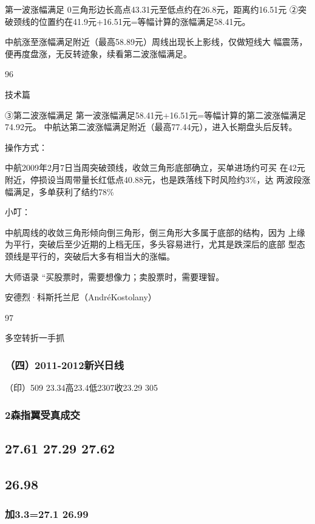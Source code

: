 \documentclass{article}
\begin{document}
第一波涨幅满足 0三角形边长高点43.31元至低点约在26.8元，距离约16.51元 ②突破颈线的位置约在41.9元+16.51元=等幅计算的涨幅满足58.41元。

中航涨至涨幅满足附近（最高58.89元）周线出现长上影线，仅做短线大 幅震荡，便再度盘涨，无反转迹象，续看第二波涨幅满足。

96

\clearpage

技术篇

③第二波涨幅满足 第一波涨幅满足58.41元+16.51元=等幅计算的第二波涨幅满足74.92元。 中航达第二波涨幅满足附近（最高77.44元），进入长期盘头后反转。

操作方式：

中航2009年2月7日当周突破颈线，收敛三角形底部确立，买单进场约可买 在42元附近，停损设当周带量长红低点40.88元，也是跌落线下时风险约3\%，达 两波段涨幅满足，多单获利了结约78\%

小叮：

中航周线的收敛三角形倾向倒三角形，倒三角形大多属于底部的结构，因为 上缘为平行，突破后至少近期的上档无压，多头容易进行，尤其是跌深后的底部 型态颈线是平行的，突破后大多有相当大的涨幅。

大师语录 “买股票时，需要想像力；卖股票时，需要理智。

安德烈·科斯托兰尼（AndréKostolany）

97

\clearpage

多空转折一手抓

\subsubsection{（四）2011-2012新兴日线}

（印）509 23.34高23.4低2307收23.29 305

\subsubsection{2森指翼受真成交}

\subsection{27.61 27.29 27.62}

\subsection{26.98}

\subsubsection{加3.3=27.1 26.99}
\end{document}
